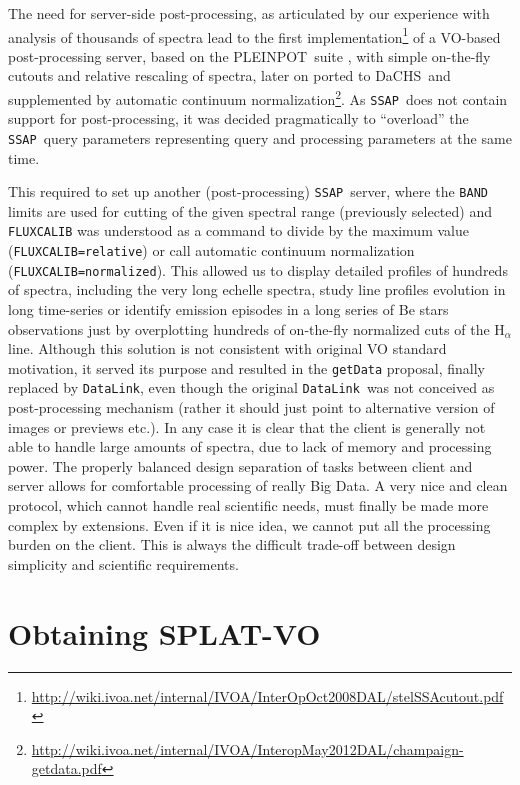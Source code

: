 \documentclass[final,authoryear,5p,times,twocolumn]{elsarticle}
\newcommand{\datalink}{\texttt{DataLink}}
\newcommand{\ssap}{\texttt{SSAP}}
\newcommand{\dachs}{\textsf{\small DaCHS}}
\newcommand{\pleinpot}{\textsf{\small PLEINPOT}}
\begin{document}
The need for server-side post-processing, as articulated by our
experience with analysis of thousands of spectra lead to the first
implementation\footnote{\url{http://wiki.ivoa.net/internal/IVOA/InterOpOct2008DAL/stelSSAcutout.pdf}}
of a VO-based post-processing server, based on the \pleinpot\ suite
\citep{2005ASPC..347..385C}, with simple on-the-fly cutouts and
relative rescaling of spectra, later on ported to \dachs\ and
supplemented by automatic continuum
normalization\footnote{\url{http://wiki.ivoa.net/internal/IVOA/InteropMay2012DAL/champaign-getdata.pdf}}.
As \ssap\ does not contain support for post-processing, it was decided
pragmatically to ``overload'' the \ssap\ query parameters representing
query and processing parameters at the same time.

This required to set up another (post-processing) \ssap\ server, where
the \texttt{BAND} limits are used for cutting of the given spectral
range (previously selected) and \texttt{FLUXCALIB} was understood as a
command to divide by the maximum value (\texttt{FLUXCALIB=relative})
or call automatic continuum normalization
(\texttt{FLUXCALIB=normalized}).  This allowed us to display detailed
profiles of hundreds of spectra, including the very long echelle
spectra, study line profiles evolution in long time-series or identify
emission episodes in a long series of Be stars observations just by
overplotting hundreds of on-the-fly normalized cuts of the H$_\alpha$
line.  Although this solution is not consistent with original VO
standard motivation, it served its purpose and resulted in the
\texttt{getData} proposal, finally replaced by \datalink, even though
the original \datalink\ was not conceived as post-processing mechanism
(rather it should just point to alternative version of images or
previews etc.).  In any case it is clear that the client is generally
not able to handle large amounts of spectra, due to lack of memory and
processing power. The properly balanced design separation of tasks
between client and server allows for comfortable processing of really
Big Data.  A very nice and clean protocol, which cannot handle real
scientific needs, must finally be made more complex by
extensions. Even if it is nice idea, we cannot put all the processing
burden on the client.  This is always the difficult trade-off between
design simplicity and scientific requirements.

\section{Obtaining SPLAT-VO}
\end{document}
